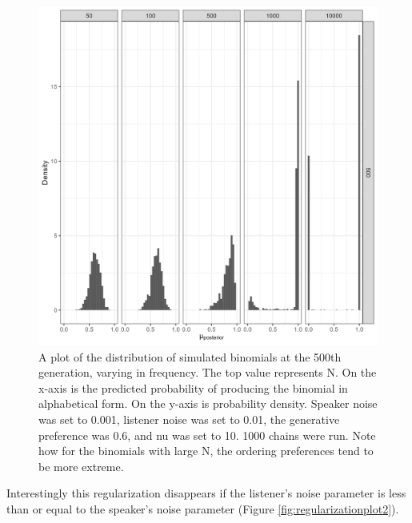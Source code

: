 \documentclass[
  jou,floatsintext]{apa6}
\begin{document}
\begin{figure}

{\centering \includegraphics[width=1\linewidth]{Figures/speaker_noise_001_listener_01} 

}

\caption{A plot of the distribution of simulated binomials at the 500th generation, varying in frequency. The top value represents N. On the x-axis is the predicted probability of producing the binomial in alphabetical form. On the y-axis is probability density. Speaker noise was set to 0.001, listener noise was set to 0.01, the generative preference was 0.6, and nu was set to 10. 1000 chains were run. Note how for the binomials with large N, the ordering preferences tend to be more extreme.}\label{fig:regularizationplot1}
\end{figure}

Interestingly this regularization disappears if the listener's noise parameter is less than or equal to the speaker's noise parameter (Figure \ref{fig:regularizationplot2}).
\end{document}
